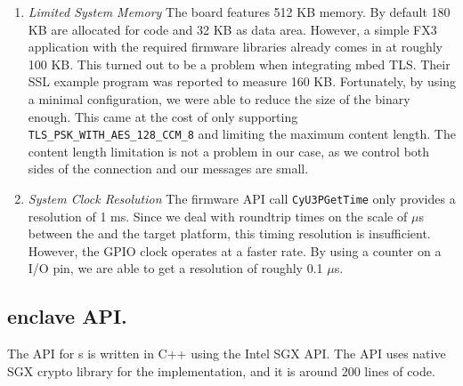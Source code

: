 \begin{enumerate}
  \item \emph{Limited System Memory} The board features 512 KB memory. By default 180 KB are allocated for code and 32 KB as data area. However, a simple FX3 application with the required firmware libraries already comes in at roughly 100 KB. This turned out to be a problem when integrating mbed TLS. Their SSL example program was reported to measure 160 KB. Fortunately, by using a minimal configuration, we were able to reduce the size of the binary enough. This came at the cost of only supporting \texttt{TLS\_PSK\_WITH\_AES\_128\_CCM\_8} and limiting the maximum content length. The content length limitation is not a problem in our case, as we control both sides of the connection and our messages are small.

 \item \emph{System Clock Resolution} The firmware API call \texttt{CyU3PGetTime} only provides a resolution of 1 ms. Since we deal with roundtrip times on the scale of $\mu$s between the \device and the target platform, this timing resolution is insufficient. However, the GPIO clock operates at a faster rate. By using a counter on a I/O pin, we are able to get a resolution of roughly 0.1 $\mu$s.
  
\end{enumerate}

\subsection{\name enclave API.} 
The \name API for \app{}s is written in C++ using the Intel SGX API. The API uses native SGX crypto library for the \tls implementation, and it is around 200 lines of code.